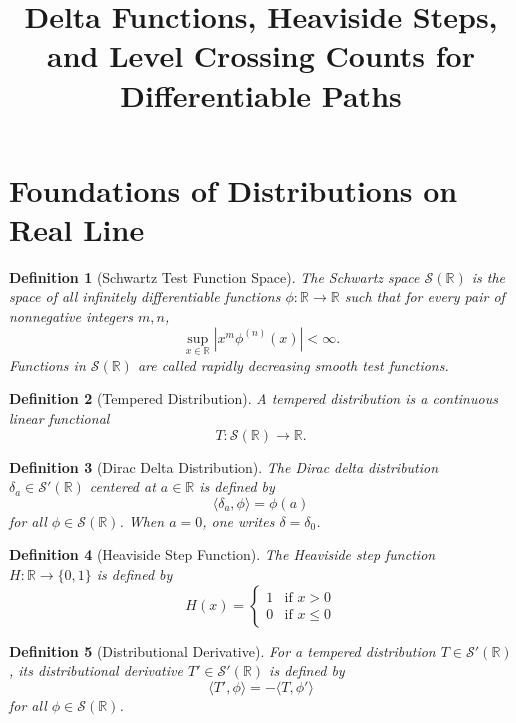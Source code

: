 \documentclass[11pt]{article}
\title{Delta Functions, Heaviside Steps, and Level Crossing Counts for Differentiable Paths}
\date{}
\newtheorem{definition}{Definition}
\begin{document}
\maketitle

\section{Foundations of Distributions on Real Line}

\begin{definition}[Schwartz Test Function Space]
The Schwartz space $\mathcal{S}(\mathbb{R})$ is the space of all infinitely differentiable functions $\phi: \mathbb{R} \to \mathbb{R}$ such that for every pair of nonnegative integers $m,n$,
\[
\sup_{x \in \mathbb{R}} |x^{m} \phi^{(n)} (x)| < \infty.
\]
Functions in $\mathcal{S}(\mathbb{R})$ are called rapidly decreasing smooth test functions.
\end{definition}

\begin{definition}[Tempered Distribution]
A tempered distribution is a continuous linear functional
\[
T: \mathcal{S}(\mathbb{R}) \to \mathbb{R}.
\]
\end{definition}

\begin{definition}[Dirac Delta Distribution]
The Dirac delta distribution $\delta_a \in \mathcal{S}'(\mathbb{R})$ centered at $a \in \mathbb{R}$ is defined by
\[
\langle \delta_a, \phi \rangle = \phi(a)
\]
for all $\phi \in \mathcal{S}(\mathbb{R})$. When $a = 0$, one writes $\delta = \delta_0$.
\end{definition}

\begin{definition}[Heaviside Step Function]
The Heaviside step function $H: \mathbb{R} \to \{0,1\}$ is defined by
\[
H(x) = \begin{cases}
1 & \text{if } x > 0 \\
0 & \text{if } x \leq 0
\end{cases}
\]
\end{definition}

\begin{definition}[Distributional Derivative]
For a tempered distribution $T \in \mathcal{S}'(\mathbb{R})$, its distributional derivative $T' \in \mathcal{S}'(\mathbb{R})$ is defined by
\[
\langle T', \phi \rangle = -\langle T, \phi' \rangle
\]
for all $\phi \in \mathcal{S}(\mathbb{R})$.
\end{definition}
\end{document}
